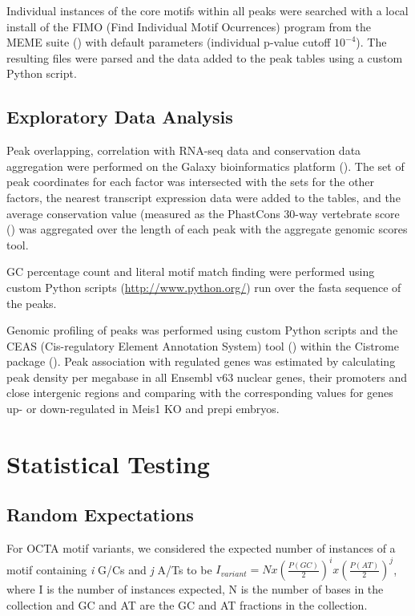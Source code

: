 Individual instances of the core motifs within all peaks were searched with a local install of the FIMO (Find Individual Motif Ocurrences) program from the MEME suite (\cite{Bailey2009}) with default parameters (individual p-value cutoff $10^{-4}$). The resulting files were parsed and the data added to the peak tables using a custom Python script. 



\subsection{Exploratory Data Analysis}


Peak overlapping, correlation with RNA-seq data and conservation data aggregation were performed on the Galaxy bioinformatics platform (\cite{Blankenberg2010a, Goecks2010}). The set of peak coordinates for each factor was intersected with the sets for the other factors, the nearest transcript expression data were added to the tables, and the average conservation value (measured as the PhastCons 30-way vertebrate score (\cite{Siepel2005}) was aggregated over the length of each peak with the aggregate genomic scores tool.

GC percentage count and literal motif match finding were performed using custom Python scripts (\url{http://www.python.org/}) run over the fasta sequence of the peaks.

Genomic profiling of peaks was performed using custom Python scripts and the CEAS (Cis-regulatory Element Annotation System) tool (\cite{Shin2009}) within the Cistrome package (\cite{Liu2011}). Peak association with regulated genes was estimated by calculating peak density per megabase in all Ensembl v63 nuclear genes, their promoters and close intergenic regions and comparing with the corresponding values for genes up- or down-regulated in Meis1 \ac{KO} and \ac{prepi} embryos. 

\section{Statistical Testing}

\subsection{Random Expectations}

For \ac{OCTA} motif variants, we considered the expected number of instances of a motif containing \textit{i} G/Cs and \textit{j} A/Ts to be $I_{variant} = N x {\left(\frac{P(GC)}{2}\right)}^i x {\left(\frac{P(AT)}{2}\right)}^j$, where I is the number of instances expected, N is the number of bases in the collection and GC and AT are the GC and AT fractions in the collection.

